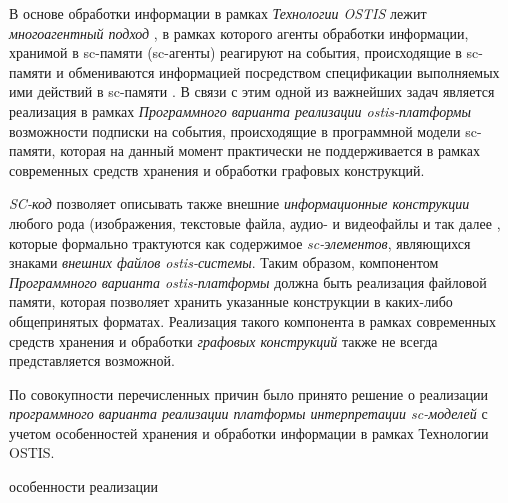 \begin{SCn}
\begin{scnsubstruct}
\begin{scnsubstruct}
{\begin{scnitemize}
		\item В основе обработки информации в рамках \textit{Технологии OSTIS} лежит \textit{многоагентный подход} \cite{Shunkevich2022a}, в рамках которого агенты обработки информации, хранимой в sc-памяти (sc-агенты) реагируют на события, происходящие в sc-памяти и обмениваются информацией посредством спецификации выполняемых ими действий в sc-памяти \cite{Shunkevich2018}. В связи с этим одной из важнейших задач является реализация в рамках \textit{Программного варианта реализации ostis-платформы} возможности подписки на события, происходящие в программной модели sc-памяти, которая на данный момент практически не поддерживается в рамках современных средств хранения и обработки графовых конструкций.
		\item \textit{SC-код} позволяет описывать также внешние \textit{информационные конструкции} любого рода (изображения, текстовые файла, аудио- и видеофайлы и так далее \cite{Ivashenko2022}, которые формально трактуются как содержимое \textit{sc-элементов}, являющихся знаками \textit{внешних файлов ostis-системы}. Таким образом, компонентом \textit{Программного варианта ostis-платформы} должна быть реализация файловой памяти, которая позволяет хранить указанные конструкции в каких-либо общепринятых форматах. Реализация такого компонента в рамках современных средств хранения и обработки \textit{графовых конструкций} также не всегда представляется возможной.
	\end{scnitemize}
	По совокупности перечисленных причин было принято решение о реализации \textit{программного варианта реализации платформы интерпретации sc-моделей}  с учетом особенностей хранения и обработки информации в рамках Технологии OSTIS.}
    \begin{scnrelfromset}{особенности реализации}

\end{scnrelfromset}
\end{scnsubstruct}
\end{scnsubstruct}
\end{SCn}
